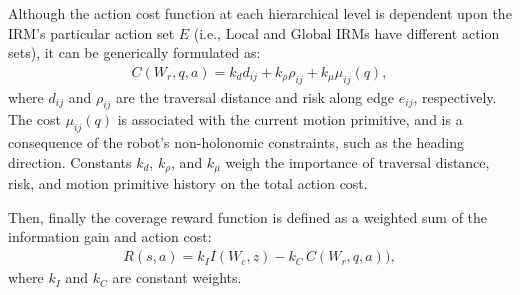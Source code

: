 \documentclass[letterpaper]{article} %
\begin{document}
Although the action cost function at each hierarchical level is dependent upon the IRM's particular action set $E$ (i.e., Local and Global IRMs have different action sets), it can be generically formulated as:
\begin{align}
    C(W_{r}, q, a) = k_d d_{ij} + k_\rho \rho_{ij} + k_\mu \mu_{ij}(q),
\end{align}
where $d_{ij}$ and $\rho_{ij}$ are the traversal distance and risk along edge $e_{ij}$, respectively. The cost $\mu_{ij}(q)$ is associated with the current motion primitive, and is a consequence of the robot's non-holonomic constraints, such as the heading direction. Constants $k_d$, $k_\rho$, and $k_\mu$ weigh the importance of traversal distance, risk, and motion primitive history on the total action cost.

Then, finally the coverage reward function is defined as a weighted sum of the information gain and action cost:
\begin{align}
    R(s, a) = k_I I(W_{c}, z) - k_C \, C(W_{r}, q, a)),
\end{align}
where $k_I$ and $k_C$ are constant weights.



\end{document}
